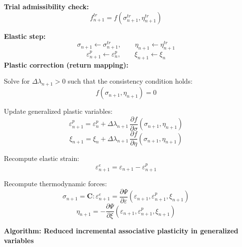 \documentclass[11pt,a4paper]{article}
\begin{document}
\begin{algorithmic}[1]
    \State \textbf{Trial admissibility check:}
    \[
    f_{n+1}^{tr}
    =
    f(\sigma_{n+1}^{tr},\eta_{n+1}^{tr})
    \]

        \State \textbf{Elastic step:}
        \[
        \sigma_{n+1}\gets \sigma_{n+1}^{tr},
        \qquad
        \eta_{n+1}\gets \eta_{n+1}^{tr}
        \]
        \[
        \varepsilon_{n+1}^p\gets \varepsilon_n^p,
        \qquad
        \xi_{n+1}\gets \xi_n
        \]
    \Else
        \State \textbf{Plastic correction (return mapping):}

        \State Solve for $\Delta\lambda_{n+1}>0$ such that the consistency condition holds:
        \[
        f(\sigma_{n+1},\eta_{n+1})=0
        \]

        \State Update generalized plastic variables:
        \[
        \varepsilon_{n+1}^p
        =
        \varepsilon_n^p
        +
        \Delta\lambda_{n+1}\,
        \frac{\partial f}{\partial \sigma}(\sigma_{n+1},\eta_{n+1})
        \]
        \[
        \xi_{n+1}
        =
        \xi_n
        +
        \Delta\lambda_{n+1}\,
        \frac{\partial f}{\partial \eta}(\sigma_{n+1},\eta_{n+1})
        \]

        \State Recompute elastic strain:
        \[
        \varepsilon_{n+1}^e
        =
        \varepsilon_{n+1}-\varepsilon_{n+1}^p
        \]

        \State Recompute thermodynamic forces:
        \[
        \sigma_{n+1}
        =
        \mathbf C:\varepsilon_{n+1}^e
        =
        \frac{\partial\Psi}{\partial\varepsilon}
        (\varepsilon_{n+1},\varepsilon_{n+1}^p,\xi_{n+1})
        \]
        \[
        \eta_{n+1}
        =
        -
        \frac{\partial\Psi}{\partial\xi}
        (\varepsilon_{n+1},\varepsilon_{n+1}^p,\xi_{n+1})
        \]
    \EndIf

\EndFor

\end{algorithmic}

\newpage
\noindent\textbf{Algorithm: Reduced incremental associative plasticity in generalized variables}
\end{document}
